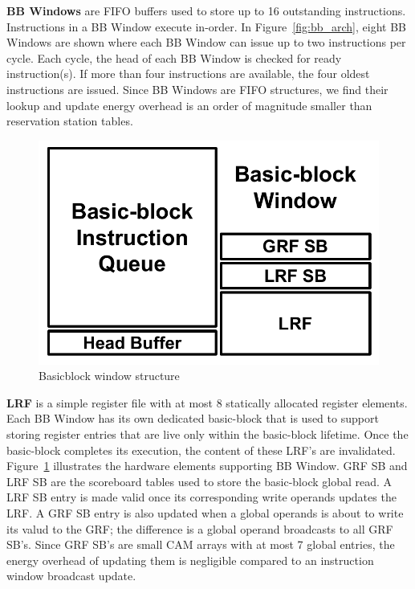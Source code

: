 \label{sec:bb_window}

\textbf{BB Windows} are FIFO buffers used to store up to 16 outstanding
instructions.  Instructions in a BB Window execute in-order. In
Figure~\ref{fig:bb_arch}, eight BB Windows are shown where each BB Window can
issue up to two instructions per cycle. Each cycle, the head of each BB Window
is checked for ready instruction(s). If more than four instructions are
available, the four oldest instructions are issued. Since BB Windows are FIFO
structures, we find their lookup and update energy overhead is an order of
magnitude smaller than reservation station tables.

\begin{figure}
	\centering
	\includegraphics[width=0.6\columnwidth]{fig/bb_window.pdf} 
	\caption{Basicblock window structure}
	\label{fig:bb_window}
\end{figure}

\textbf{LRF} is a simple register file with at most 8 statically
allocated register elements. Each BB Window has its own dedicated basic-block
that is used to support storing register entries that are live only within the
basic-block lifetime. Once the basic-block completes its execution, the content
of these LRF's are invalidated. Figure~\ref{fig:bb_window} illustrates the hardware
elements supporting BB Window. GRF SB and LRF SB are the scoreboard tables used
to store the basic-block global read. A LRF SB entry is made valid once its
corresponding write operands updates the LRF. A GRF SB entry is also updated
when a global operands is about to write its valud to the GRF; the difference is a
global operand broadcasts to all GRF SB's. Since GRF SB's are small CAM arrays
with at most 7 global entries, the energy overhead of updating them is
negligible compared to an instruction window broadcast update.

